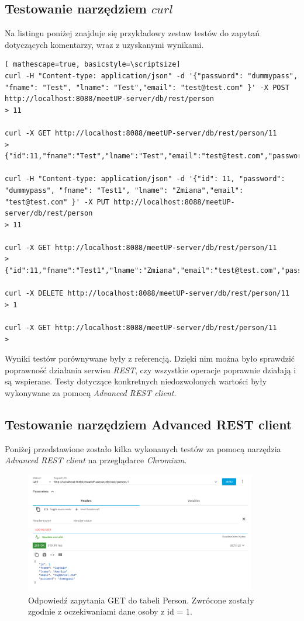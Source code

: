 \documentclass[12pt]{article}
\begin{document}
\subsection{Testowanie narzędziem $curl$}
Na listingu poniżej znajduje się przykładowy zestaw testów do zapytań dotyczących komentarzy, wraz z uzyskanymi wynikami.
\begin{lstlisting}[ mathescape=true, basicstyle=\scriptsize]
curl -H "Content-type: application/json" -d '{"password": "dummypass", "fname": "Test", "lname": "Test","email": "test@test.com" }' -X POST http://localhost:8088/meetUP-server/db/rest/person
> 11

curl -X GET http://localhost:8088/meetUP-server/db/rest/person/11
> {"id":11,"fname":"Test","lname":"Test","email":"test@test.com","password":"dummypass"}

curl -H "Content-type: application/json" -d '{"id": 11, "password": "dummypass", "fname": "Test1", "lname": "Zmiana","email": "test@test.com" }' -X PUT http://localhost:8088/meetUP-server/db/rest/person
> 11

curl -X GET http://localhost:8088/meetUP-server/db/rest/person/11
> {"id":11,"fname":"Test1","lname":"Zmiana","email":"test@test.com","password":"dummypass"}

curl -X DELETE http://localhost:8088/meetUP-server/db/rest/person/11
> 1

curl -X GET http://localhost:8088/meetUP-server/db/rest/person/11
>
\end{lstlisting}

Wyniki testów porównywane były z referencją. Dzięki nim można było sprawdzić poprawność działania serwisu \textit{REST}, czy wszystkie operacje poprawnie działają i są wspierane. Testy dotyczące konkretnych niedozwolonych wartości były wykonywane za pomocą \textit{Advanced REST client}.

\subsection{Testowanie narzędziem Advanced REST client}
Poniżej przedstawione zostało kilka wykonanych testów za pomocą narzędzia \textit{Advanced REST client} na przeglądarce \textit{Chromium}.

\begin{figure}[H]
\centering
\includegraphics[width=0.9\textwidth]{chrome2.png}
\caption{Odpowiedź zapytania GET do tabeli Person. Zwrócone zostały zgodnie z oczekiwaniami dane osoby z id = 1.}
\end{figure}
\end{document}
